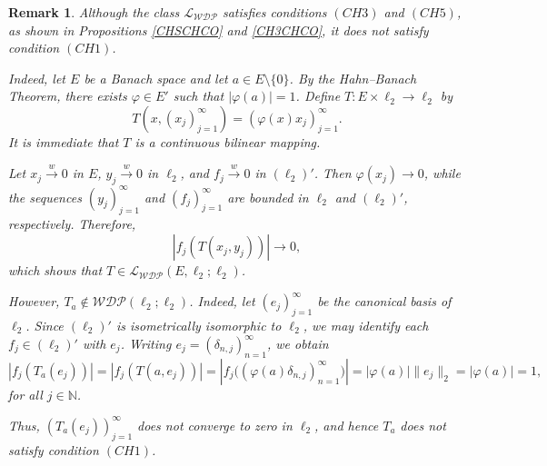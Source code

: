 \documentclass[12 pt]{article}%
\newtheorem{theorem}{Theorem}[section]
\newtheorem{remark}[theorem]{Remark}
\newtheorem{final remark}[theorem]{Final Remark}
\begin{document}
\begin{remark}\label{WDP(CH1)}
	Although the class $\mathcal{L_{WDP}}$ satisfies conditions $(CH3)$ and $(CH5)$, as shown in Propositions \ref{CHSCHCO} and \ref{CH3CHCO}, it does not satisfy condition $(CH1)$.
	
	Indeed, let $E$ be a Banach space and let $a \in E \setminus \{0\}$. By the Hahn--Banach Theorem, there exists $\varphi \in E'$ such that $|\varphi(a)| = 1$. Define $T\colon E \times \ell_2 \to \ell_2$ by
	\[
	T(x,(x_j)_{j=1}^{\infty}) = (\varphi(x)x_j)_{j=1}^{\infty}.
	\]
	It is immediate that $T$ is a continuous bilinear mapping.
	
	Let $x_j \overset{w}{\to} 0$ in $E$, $y_j \overset{w}{\to} 0$ in $\ell_2$, and $f_j \overset{w}{\to} 0$ in $(\ell_2)'$. Then $\varphi(x_j) \to 0$, while the sequences $(y_j)_{j=1}^{\infty}$ and $(f_j)_{j=1}^{\infty}$ are bounded in $\ell_2$ and $(\ell_2)'$, respectively. Therefore,
	\[
	|f_j(T(x_j,y_j))| \longrightarrow 0,
	\]
	which shows that $T \in \mathcal{L_{WDP}}(E,\ell_2;\ell_2)$.
	
	However, $T_a \notin \mathcal{WDP}(\ell_2;\ell_2)$. Indeed, let $(e_j)_{j=1}^{\infty}$ be the canonical basis of $\ell_2$. Since $(\ell_2)'$ is isometrically isomorphic to $\ell_2$, we may identify each $f_j \in (\ell_2)'$ with $e_j$. Writing $e_j = (\delta_{n,j})_{n=1}^{\infty}$, we obtain
	\[
	|f_j(T_a(e_j))| = |f_j(T(a,e_j))|
	= \left|f_j\big((\varphi(a)\delta_{n,j})_{n=1}^{\infty}\big)\right|
	= |\varphi(a)| \|e_j\|_2
	= |\varphi(a)| = 1,
	\]
	for all $j \in \mathbb{N}$.
	
	Thus, $(T_a(e_j))_{j=1}^{\infty}$ does not converge to zero in $\ell_2$, and hence $T_a$ does not satisfy condition $(CH1)$.
\end{remark}



\end{document}
